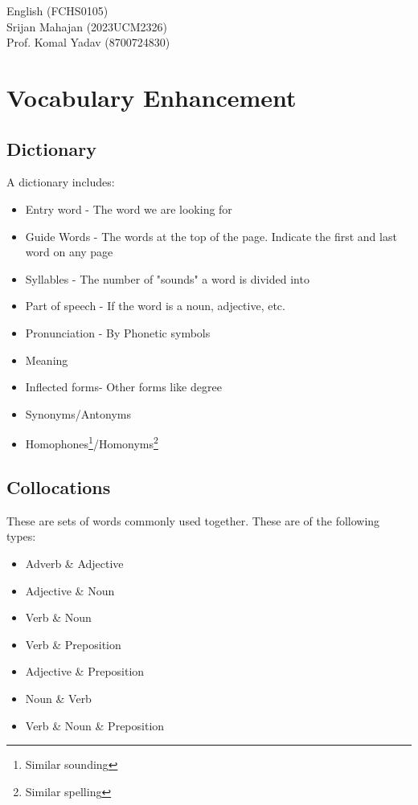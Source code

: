 


	\begin{titlepage}
		\begin{center}
			\Huge{English (FCHS0105)}\\
			Srijan Mahajan (2023UCM2326)\\
			Prof. Komal Yadav (8700724830)
		\end{center}
	\end{titlepage}
	\tableofcontents
	\newpage
	\chapter{Vocabulary Enhancement}
	\section{Dictionary}
	A dictionary includes:
	\begin{itemize}
		\item Entry word - The word we are looking for
		\item Guide Words - The words at the top of the page. Indicate the first and last word on any page
		\item Syllables - The number of "sounds" a word is divided into
		\item Part of speech - If the word is a noun, adjective, etc.
		\item Pronunciation - By Phonetic symbols
		\item Meaning
		\item Inflected forms- Other forms like degree
		\item Synonyms/Antonyms
		\item Homophones\footnote{Similar sounding}/Homonyms\footnote{Similar spelling}
	\end{itemize}
	\section{Collocations}
	These are sets of words commonly used together. These are of the following types:
	\begin{itemize}
		\item Adverb \& Adjective
		\item Adjective \& Noun
		\item Verb \& Noun
		\item Verb \& Preposition
		\item Adjective \& Preposition
		\item Noun \& Verb
		\item Verb \& Noun \& Preposition
	\end{itemize}

